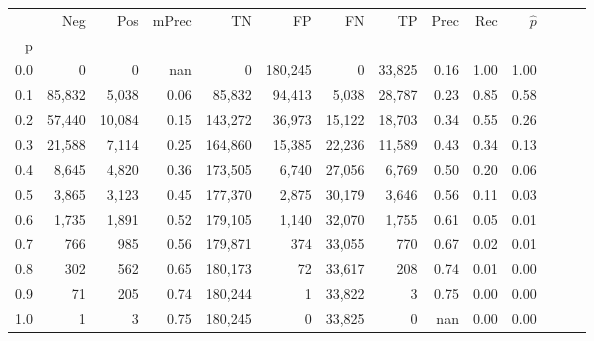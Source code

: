\begin{tabular}{rrrrrrrrrrrrrr}
\toprule
{} &     Neg &     Pos & mPrec &       TN &       FP &      FN &      TP &  Prec &   Rec & $\hat{p}$ \\
p   &         &         &       &          &          &         &         &       &       &           \\
\midrule
0.0 &       0 &       0 &   nan &        0 &  180,245 &       0 &  33,825 &  0.16 &  1.00 &      1.00 \\
0.1 &  85,832 &   5,038 &  0.06 &   85,832 &   94,413 &   5,038 &  28,787 &  0.23 &  0.85 &      0.58 \\
0.2 &  57,440 &  10,084 &  0.15 &  143,272 &   36,973 &  15,122 &  18,703 &  0.34 &  0.55 &      0.26 \\
0.3 &  21,588 &   7,114 &  0.25 &  164,860 &   15,385 &  22,236 &  11,589 &  0.43 &  0.34 &      0.13 \\
0.4 &   8,645 &   4,820 &  0.36 &  173,505 &    6,740 &  27,056 &   6,769 &  0.50 &  0.20 &      0.06 \\
0.5 &   3,865 &   3,123 &  0.45 &  177,370 &    2,875 &  30,179 &   3,646 &  0.56 &  0.11 &      0.03 \\
0.6 &   1,735 &   1,891 &  0.52 &  179,105 &    1,140 &  32,070 &   1,755 &  0.61 &  0.05 &      0.01 \\
0.7 &     766 &     985 &  0.56 &  179,871 &      374 &  33,055 &     770 &  0.67 &  0.02 &      0.01 \\
0.8 &     302 &     562 &  0.65 &  180,173 &       72 &  33,617 &     208 &  0.74 &  0.01 &      0.00 \\
0.9 &      71 &     205 &  0.74 &  180,244 &        1 &  33,822 &       3 &  0.75 &  0.00 &      0.00 \\
1.0 &       1 &       3 &  0.75 &  180,245 &        0 &  33,825 &       0 &   nan &  0.00 &      0.00 \\
\bottomrule
\end{tabular}
